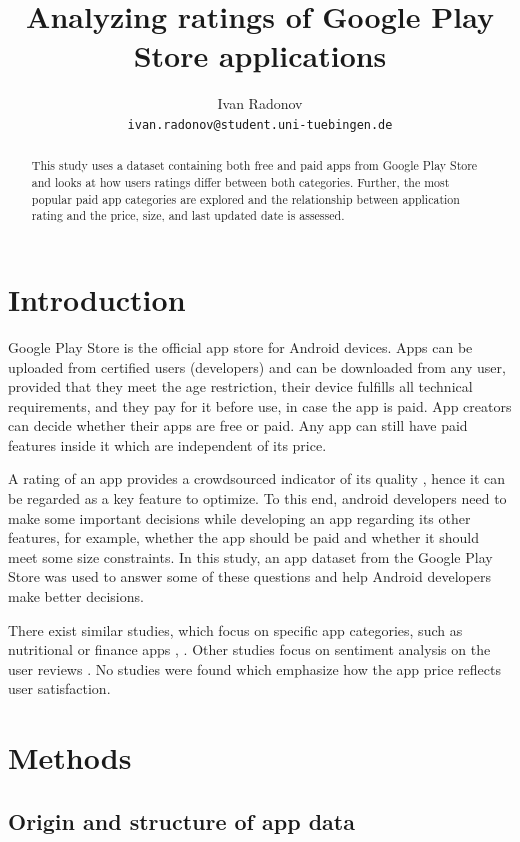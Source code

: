 \documentclass{article}
\title{Analyzing ratings of Google Play Store applications}
\author{%
  Ivan Radonov \\
  \texttt{ivan.radonov@student.uni-tuebingen.de} \\
  }
\begin{document}
\maketitle

\begin{abstract}
  This study uses a dataset containing both free and paid apps from Google Play Store and looks at how users ratings differ between both categories. Further, the most popular paid app categories are explored and the relationship between application rating and the price, size, and last updated date is assessed.
\end{abstract}

\section{Introduction}

Google Play Store is the official app store for Android devices. Apps can be uploaded from certified users (developers) and can be downloaded from any user, provided that they meet the age restriction, their device fulfills all technical requirements, and they pay for it before use, in case the app is paid. App creators can decide whether their apps are free or paid. Any app can still have paid features inside it which are independent of its price.

A rating of an app provides a crowdsourced indicator of its quality \cite{mobileapprating}, hence it can be regarded as a key feature to optimize. To this end, android developers need to make some important decisions while developing an app regarding its other features, for example, whether the app should be paid and whether it should meet some size constraints. In this study, an app dataset from the Google Play Store was used to answer some of these questions and help Android developers make better decisions.

There exist similar studies, which focus on specific app categories, such as nutritional or finance apps \cite{nutritionalapps}, \cite{financialapps}. Other studies focus on sentiment analysis on the user reviews \cite{sentiment}. No studies were found which emphasize how the app price reflects user satisfaction.

\section{Methods}

\subsection{Origin and structure of app data}
\end{document}
